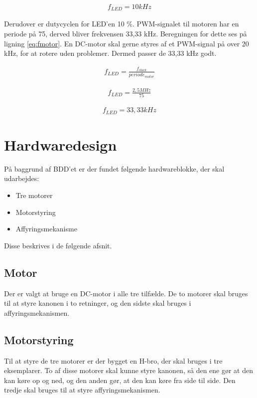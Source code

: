 \begin{align}
f_{LED} = 10 kHz \nonumber
\end{align}

\noindent Derudover er dutycyclen for LED'en 10 \%. PWM-signalet til motoren har en periode på 75, derved bliver frekvensen 33,33 kHz. Beregningen for dette ses på ligning \ref{eq:fmotor}. En DC-motor skal gerne styres af et PWM-signal på over 20 kHz, for at rotere uden problemer. Dermed passer de 33,33 kHz godt. 

\begin{align}
f_{LED} = \frac{f_{clock}}{periode_{motor}} \label{eq:fmotor}
\end{align}

\begin{align}
f_{LED} = \frac{2,5 MHz}{75}\nonumber
\end{align}

\begin{align}
f_{LED} = 33,33 kHz \nonumber
\end{align}


\section{Hardwaredesign}
På baggrund af BDD'et er der fundet følgende hardwareblokke, der skal udarbejdes: 

\begin{itemize}
	\item Tre motorer
	\item Motorstyring
	\item Affyringsmekanisme 
\end{itemize}

Disse beskrives i de følgende afsnit. 

\subsection{Motor}
Der er valgt at bruge en DC-motor i alle tre tilfælde. De to motorer skal bruges til at styre kanonen i to retninger, og den sidste skal bruges i affyringsmekanismen. 

\subsection{Motorstyring}
Til at styre de tre motorer er der bygget en H-bro, der skal bruges i tre eksemplarer. To af disse motorer skal kunne styre kanonen, så den ene gør at den kan køre op og ned, og den anden gør, at den kan køre fra side til side. Den tredje skal bruges til at styre affyringsmekanismen. 

